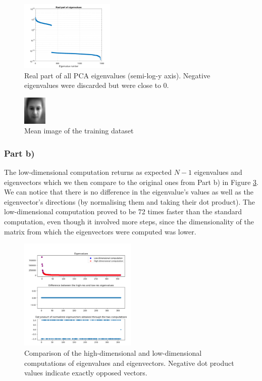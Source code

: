\documentclass[10pt,technote]{IEEEtran}
\begin{document}
\begin{figure}
    \centering
    \includegraphics[width=0.4\textwidth]{../results/ex1a/eigenvalues.png}
    \caption{Real part of all PCA eigenvalues (semi-log-y axis). Negative eigenvalues were discarded but were close to 0.}
    \label{fig:eigvals1}
\end{figure}

\begin{figure}
    \centering
    \includegraphics[width=0.1\textwidth]{../results/ex1a/mean_image.png}
    \caption{Mean image of the training dataset}
    \label{fig:mean_im1}
\end{figure}

\subsubsection{Part b)}
The low-dimensional computation returns as expected $N - 1$ eigenvalues and eigenvectors which we then compare to the original ones from Part b) in Figure \ref{fig:eig_diff1}. We can notice that there is no difference in the eigenvalue's values as well as the eigenvector's directions (by normalising them and taking their dot product). 
The low-dimensional computation proved to be 72 times faster than the standard computation, even though it involved more steps, since the dimensionality of the matrix from which the eigenvectors were computed was lower. 
\begin{figure}
    \centering
    \includegraphics[width=0.5\textwidth]{../results/ex1b/DIfference_eig.png}
    \caption{Comparison of the high-dimensional and low-dimensional computations of eigenvalues and eigenvectors. Negative dot product values indicate exactly opposed vectors.}
    \label{fig:eig_diff1}
\end{figure}
\end{document}
